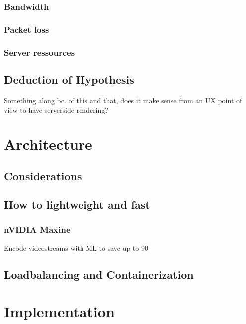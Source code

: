 \documentclass[titlepage, a4paper, 11pt]{scrartcl}
\begin{document}
            \subsubsection{Bandwidth}

            \subsubsection{Packet loss}

            \subsubsection{Server ressources}

        \subsection{Deduction of Hypothesis}

            Something along bc. of this and that, does it make sense from an UX point of view to have serverside rendering?

    \section{Architecture}

        \subsection{Considerations}

        \subsection{How to lightweight and fast}
		
			\subsubsection{nVIDIA Maxine}
				
				Encode videostreams with ML to save up to 90%

        \subsection{Loadbalancing and Containerization}

    \section{Implementation}
\end{document}
